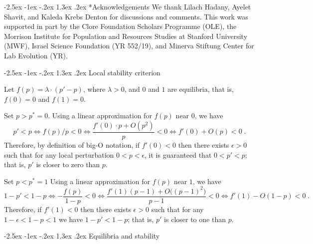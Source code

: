 \documentclass[12pt]{extarticle}
\makeatletter
\renewcommand\section{\@startsection {section}{1}{\z@}%
     {-2.5ex \@plus -1ex \@minus -.2ex}%
     {1.3ex \@plus.2ex}%
    {\Large\bfseries}}
\makeatother
\begin{document}
{\small
\section*{Acknowledgements}
We thank Lilach Hadany, Ayelet Shavit, and Kaleda Krebs Denton for discussions and comments.
This work was supported in part by
the Clore Foundation Scholars Programme (OLE),
the Morrison Institute for Population and Resources Studies at Stanford University (MWF),
Israel Science Foundation (YR 552/19),
and Minerva Stiftung Center for Lab Evolution (YR).


\begin{appendices}
\renewcommand{\theequation}{\thesection\arabic{equation}}


\section{Local stability criterion} \label{sec:appendixA}

Let $f(p)=\lambda \cdot (p'-p)$, where $\lambda>0$, and $0$ and $1$ are equilibria, that is, $f(0)=0$ and $f(1)=0$.

Set $p>p^*=0$.
Using a linear approximation for $f(p)$ near $0$, we have
\begin{equation}
p' < p \Leftrightarrow 
f(p)/p < 0 \Leftrightarrow 
\frac{f'(0) \cdot p + O(p^2)}{p} < 0 \Leftrightarrow 
f'(0) + O(p) < 0 \;.
\end{equation}
Therefore, by definition of big-O notation, if $f'(0)<0$ then there exists $\epsilon>0$ such that for any local perturbation $0<p<\epsilon$, it is guaranteed that $0<p'<p$; that is, $p'$ is closer to zero than $p$.

Set $p<p^*=1$
Using a linear approximation for $f(p)$ near $1$, we have
\begin{equation}
1-p' < 1-p  \Leftrightarrow 
-\frac{f(p)}{1-p} < 0 \Leftrightarrow 
\frac{f'(1)(p-1) + O\big((p-1)^2\big)}{p-1} < 0 \Leftrightarrow 
f'(1) - O(1-p) < 0 \;.
\end{equation}
Therefore, if $f'(1)<0$ then there exists $\epsilon>0$ such that for any $1-\epsilon<1-p<1$ we have $1-p'<1-p$; that is, $p'$ is closer to one than $p$.


\section{Equilibria and stability} \label{sec:appendixB}


\end{appendices}}
\end{document}
